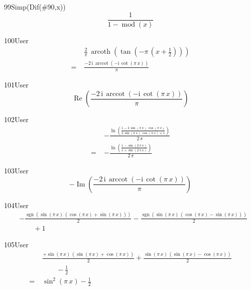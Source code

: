 \begin{espr}{99}{Simp(Dif(\#90,x))}{}
\[
\frac{1}{1 - \operatorname{mod}\!\left(x\right)}
\]
\end{espr}
\begin{espr}{100}{User}{\verificata}
\begin{align*}
& \frac{2}{\pi}\, \operatorname{arcoth}\!\left(\tan\!\left(-\pi\, \left(x + \frac{1}{2}\right)\right)\right) \\
=\;& \frac{-2\, \mathrm{i}\, \operatorname{arccot}\!\left(-\mathrm{i}\, \cot\!\left(\pi\, x\right)\right)}{\pi}
\end{align*}
\end{espr}
\begin{espr}{101}{User}{}
\[
\operatorname{Re}\!\left(\frac{-2\, \mathrm{i}\, \operatorname{arccot}\!\left(-\mathrm{i}\, \cot\!\left(\pi\, x\right)\right)}{\pi}\right)
\]
\end{espr}
\begin{espr}{102}{User}{\verificata}
\begin{align*}
& -\frac{\ln\!\left(\frac{1 - 2\, \sin\!\left(\pi\, x\right)\, \cos\!\left(\pi\, x\right)}{2\, \sin\!\left(\pi\, x\right)\, \cos\!\left(\pi\, x\right) + 1}\right)}{2\, \pi} \\
=\;& -\frac{\ln\!\left(\frac{1 - \sin\!\left(2\, \pi\, x\right)}{1 + \sin\!\left(2\, \pi\, x\right)}\right)}{2\, \pi}
\end{align*}
\end{espr}
\begin{espr}{103}{User}{}
\[
-\operatorname{Im}\!\left(\frac{-2\, \mathrm{i}\, \operatorname{arccot}\!\left(-\mathrm{i}\, \cot\!\left(\pi\, x\right)\right)}{\pi}\right)
\]
\end{espr}
\begin{espr}{104}{User}{}
\begin{align*}
& -\frac{\operatorname{sgn}\!\left(\sin\!\left(\pi\, x\right)\, \left(\cos\!\left(\pi\, x\right) + \sin\!\left(\pi\, x\right)\right)\right)}{2} - \frac{\operatorname{sgn}\!\left(\sin\!\left(\pi\, x\right)\, \left(\cos\!\left(\pi\, x\right) - \sin\!\left(\pi\, x\right)\right)\right)}{2} \\
&\qquad + 1
\end{align*}
\end{espr}
\begin{espr}{105}{User}{\verificata}
\begin{align*}
& \frac{+\sin\!\left(\pi\, x\right)\, \left(\sin\!\left(\pi\, x\right) + \cos\!\left(\pi\, x\right)\right)}{2} + \frac{\sin\!\left(\pi\, x\right)\, \left(\sin\!\left(\pi\, x\right) - \cos\!\left(\pi\, x\right)\right)}{2} \\
&\qquad - \frac{1}{2} \\
=\;& \sin^{2}\!\left(\pi\, x\right) - \frac{1}{2}
\end{align*}
\end{espr}
